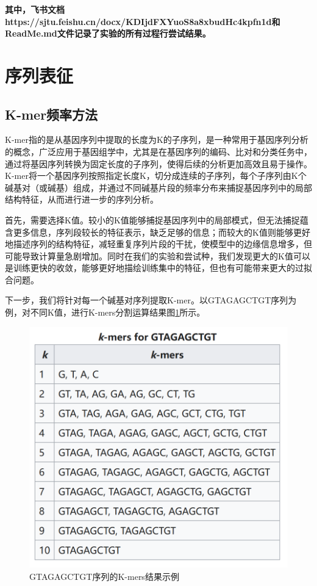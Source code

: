 \documentclass[a4paper,11pt,AutoFakeBold]{ctexart}
\begin{document}
\textbf{其中，飞书文档https://sjtu.feishu.cn/docx/KDIjdFXYuoS8a8xbudHc4kpfn1d和ReadMe.md文件记录了实验的所有过程行尝试结果。}

\section{序列表征}


\subsection{K-mer频率方法}

K-mer指的是从基因序列中提取的长度为K的子序列，是一种常用于基因序列分析的概念，广泛应用于基因组学中，尤其是在基因序列的编码、比对和分类任务中，通过将基因序列转换为固定长度的子序列，使得后续的分析更加高效且易于操作。K-mer将一个基因序列按照指定长度K，切分成连续的子序列，每个子序列由K个碱基对（或碱基）组成，并通过不同碱基片段的频率分布来捕捉基因序列中的局部结构特征，从而进行进一步的序列分析。

首先，需要选择K值。较小的K值能够捕捉基因序列中的局部模式，但无法捕捉蕴含更多信息，序列段较长的特征表示，缺乏足够的信息；而较大的K值则能够更好地描述序列的结构特征，减轻重复序列片段的干扰，使模型中的边缘信息增多，但可能导致计算量急剧增加。同时在我们的实验和尝试种，我们发现更大的K值可以是训练更快的收敛，能够更好地描绘训练集中的特征，但也有可能带来更大的过拟合问题。

下一步，我们将针对每一个碱基对序列提取K-mer。以GTAGAGCTGT序列为例，对不同K值，进行K-mers分割运算结果图\ref{fig:K-mers结果示例}所示。

\begin{figure}[h]  
    \centering
    \includegraphics[width=0.6\linewidth]{Figures/K-mers.png}
        \caption{GTAGAGCTGT序列的K-mers结果示例}
        \label{fig:K-mers结果示例}
\end{figure}
\end{document}
